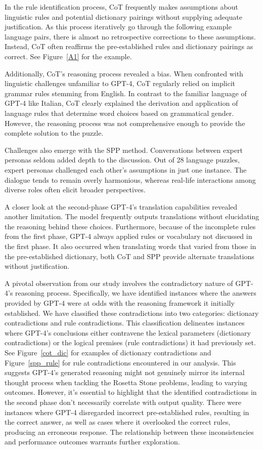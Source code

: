 \documentclass[10pt, a4paper]{article}
\begin{document}
In the rule identification process, CoT frequently makes assumptions about linguistic rules and potential dictionary pairings without supplying adequate justification. As this process iteratively go through the following example language pairs, there is almost no retrospective corrections to these assumptions. Instead, CoT often reaffirms the pre-established rules and dictionary pairings as correct. See Figure~\ref{A1} for the example.

Additionally, CoT's reasoning process revealed a bias. When confronted with linguistic challenges unfamiliar to GPT-4, CoT regularly relied on implicit grammar rules stemming from English. In contrast to the familiar language of GPT-4 like Italian, CoT clearly explained the derivation and application of language rules that determine word choices based on grammatical gender. However, the reasoning process was not comprehensive enough to provide the complete solution to the puzzle.

Challenges also emerge with the SPP method. Conversations between expert personas seldom added depth to the discussion. Out of 28 language puzzles, expert personas challenged each other's assumptions in just one instance. The dialogue tends to remain overly harmonious, whereas real-life interactions among diverse roles often elicit broader perspectives.

A closer look at the second-phase GPT-4's translation capabilities revealed another limitation. The model frequently outputs translations without elucidating the reasoning behind these choices. Furthermore, because of the incomplete rules from the first phase, GPT-4 always applied rules or vocabulary not discussed in the first phase. It also occurred when translating words that varied from those in the pre-established dictionary, both CoT and SPP provide alternate translations without justification.

A pivotal observation from our study involves the contradictory nature of GPT-4's reasoning process. Specifically, we have identified instances where the answers provided by GPT-4 were at odds with the reasoning framework it initially established. We have classified these contradictions into two categories: dictionary contradictions and rule contradictions. This classification delineates instances where GPT-4's conclusions either contravene the lexical parameters (dictionary contradictions) or the logical premises (rule contradictions) it had previously set. See Figure~\ref{cot_dic} for examples of dictionary contradictions and Figure~\ref{spp_rule} for rule contradictions encountered in our analysis.  This suggests GPT-4's generated reasoning might not genuinely mirror its internal thought process when tackling the Rosetta Stone problems, leading to varying outcomes. However, it's essential to highlight that the identified contradictions in the second phase don't necessarily correlate with output quality. There were instances where GPT-4 disregarded incorrect pre-established rules, resulting in the correct answer, as well as cases where it overlooked the correct rules, producing an erroneous response. The relationship between these inconsistencies and performance outcomes warrants further exploration.
\end{document}
